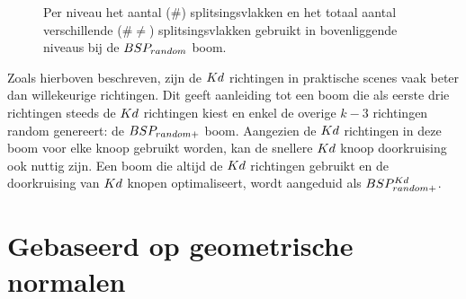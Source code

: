 \begin{figure}
   \caption{Per niveau het aantal ($\#$) splitsingsvlakken en het totaal aantal verschillende ($\# \neq$) splitsingsvlakken gebruikt in bovenliggende niveaus bij de $BSP_{random}$ boom.} %
   \label{fig:splitsingsvlakken-bsprandom}
\end{figure}

Zoals hierboven beschreven, zijn de $Kd$ richtingen in praktische scenes vaak beter dan willekeurige richtingen.
Dit geeft aanleiding tot een boom die als eerste drie richtingen steeds de $Kd$ richtingen kiest en enkel de overige $k - 3$ richtingen random genereert: de $BSP_{random+}$ boom. Aangezien de $Kd$ richtingen in deze boom voor elke knoop gebruikt worden, kan de snellere $Kd$ knoop doorkruising ook nuttig zijn. Een boom die altijd de $Kd$ richtingen gebruikt en de doorkruising van $Kd$ knopen optimaliseert, wordt aangeduid als $BSP^{Kd}_{random+}$.


\section{Gebaseerd op geometrische normalen}
